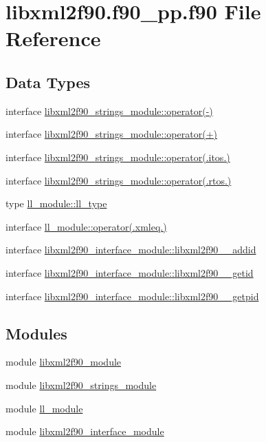 \hypertarget{libxml2f90_8f90__pp_8f90}{}\section{libxml2f90.\+f90\+\_\+pp.\+f90 File Reference}
\label{libxml2f90_8f90__pp_8f90}
\subsection*{Data Types}
\begin{DoxyCompactItemize}
\item 
interface \hyperlink{interfacelibxml2f90__strings__module_1_1operator_07-_08}{libxml2f90\+\_\+strings\+\_\+module\+::operator(-\/)}
\item 
interface \hyperlink{interfacelibxml2f90__strings__module_1_1operator_07_09_08}{libxml2f90\+\_\+strings\+\_\+module\+::operator(+)}
\item 
interface \hyperlink{interfacelibxml2f90__strings__module_1_1operator_07_8itos_8_08}{libxml2f90\+\_\+strings\+\_\+module\+::operator(.\+itos.)}
\item 
interface \hyperlink{interfacelibxml2f90__strings__module_1_1operator_07_8rtos_8_08}{libxml2f90\+\_\+strings\+\_\+module\+::operator(.\+rtos.)}
\item 
type \hyperlink{structll__module_1_1ll__type}{ll\+\_\+module\+::ll\+\_\+type}
\item 
interface \hyperlink{interfacell__module_1_1operator_07_8xmleq_8_08}{ll\+\_\+module\+::operator(.\+xmleq.)}
\item 
interface \hyperlink{interfacelibxml2f90__interface__module_1_1libxml2f90____addid}{libxml2f90\+\_\+interface\+\_\+module\+::libxml2f90\+\_\+\+\_\+addid}
\item 
interface \hyperlink{interfacelibxml2f90__interface__module_1_1libxml2f90____getid}{libxml2f90\+\_\+interface\+\_\+module\+::libxml2f90\+\_\+\+\_\+getid}
\item 
interface \hyperlink{interfacelibxml2f90__interface__module_1_1libxml2f90____getpid}{libxml2f90\+\_\+interface\+\_\+module\+::libxml2f90\+\_\+\+\_\+getpid}
\end{DoxyCompactItemize}
\subsection*{Modules}
\begin{DoxyCompactItemize}
\item 
module \hyperlink{namespacelibxml2f90__module}{libxml2f90\+\_\+module}
\item 
module \hyperlink{namespacelibxml2f90__strings__module}{libxml2f90\+\_\+strings\+\_\+module}
\item 
module \hyperlink{namespacell__module}{ll\+\_\+module}
\item 
module \hyperlink{namespacelibxml2f90__interface__module}{libxml2f90\+\_\+interface\+\_\+module}
\end{DoxyCompactItemize}
